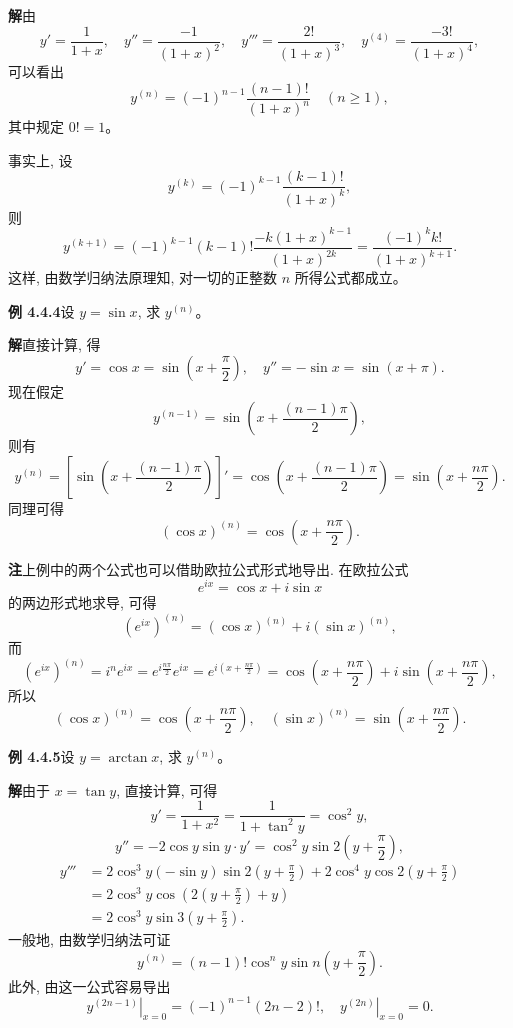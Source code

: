 \documentclass[UTF8, 12pt, fontset=fandol, oneside]{ctexart}
\begin{document}
\noindent\textbf{解}\quad 由
\[
  y'=\frac{1}{1+x},\quad
  y''=\frac{-1}{(1+x)^2},\quad
  y'''=\frac{2!}{(1+x)^3},\quad
  y^{(4)}=\frac{-3!}{(1+x)^4},
\]
可以看出
\[
  y^{(n)}
  =
  (-1)^{n-1}\frac{(n-1)!}{(1+x)^n}
  \quad(n\geqslant1),
\]
其中规定 $0!=1$。

事实上, 设
\[
  y^{(k)}
  =
  (-1)^{k-1}\frac{(k-1)!}{(1+x)^k},
\]
则
\[
  y^{(k+1)}
  =
  (-1)^{k-1}(k-1)!\frac{-k(1+x)^{k-1}}{(1+x)^{2k}}
  =
  \frac{(-1)^kk!}{(1+x)^{k+1}}.
\]
这样, 由数学归纳法原理知, 对一切的正整数 $n$ 所得公式都成立。

\noindent\textbf{例 4.4.4}\quad 设 $y=\sin x$, 求 $y^{(n)}$。

\noindent\textbf{解}\quad 直接计算, 得
\[
  y'=\cos x=\sin\left(x+\frac{\pi}{2}\right),
  \quad
  y''=-\sin x=\sin(x+\pi).
\]
现在假定
\[
  y^{(n-1)}
  =
  \sin\left(x+\frac{(n-1)\pi}{2}\right),
\]
则有
\[
  y^{(n)}
  =
  \left[\sin\left(x+\frac{(n-1)\pi}{2}\right)\right]'
  =
  \cos\left(x+\frac{(n-1)\pi}{2}\right)
  =
  \sin\left(x+\frac{n\pi}{2}\right).
\]
同理可得
\[
  (\cos x)^{(n)}
  =
  \cos\left(x+\frac{n\pi}{2}\right).
\]

\noindent\textbf{注}\quad 上例中的两个公式也可以借助欧拉公式形式地导出. 在欧拉公式
\[
  e^{ix}=\cos x+i\sin x
\]
的两边形式地求导, 可得
\[
  (e^{ix})^{(n)}
  =
  (\cos x)^{(n)}+i(\sin x)^{(n)},
\]
而
\[
  (e^{ix})^{(n)}
  =
  i^ne^{ix}
  =
  e^{i\frac{n\pi}{2}}e^{ix}
  =
  e^{i\left(x+\frac{n\pi}{2}\right)}
  =
  \cos\left(x+\frac{n\pi}{2}\right)
  +
  i\sin\left(x+\frac{n\pi}{2}\right),
\]
所以
\[
  (\cos x)^{(n)}
  =
  \cos\left(x+\frac{n\pi}{2}\right),\quad
  (\sin x)^{(n)}
  =
  \sin\left(x+\frac{n\pi}{2}\right).
\]

\noindent\textbf{例 4.4.5}\quad 设 $y=\arctan x$, 求 $y^{(n)}$。

\noindent\textbf{解}\quad 由于 $x=\tan y$, 直接计算, 可得
\[
  y'=\frac{1}{1+x^2}
  =
  \frac{1}{1+\tan^2y}
  =
  \cos^2y,
\]
\[
  y''
  =
  -2\cos y\sin y\cdot y'
  =
  \cos^2y\sin2\left(y+\frac{\pi}{2}\right),
\]
\[
\begin{aligned}
  y'''
  &=
  2\cos^3y(-\sin y)\sin2\left(y+\frac{\pi}{2}\right)
  +
  2\cos^4y\cos2\left(y+\frac{\pi}{2}\right)  \\
  &=
  2\cos^3y\cos\left(2\left(y+\frac{\pi}{2}\right)+y\right)  \\
  &=
  2\cos^3y\sin3\left(y+\frac{\pi}{2}\right).
\end{aligned}
\]
一般地, 由数学归纳法可证
\[
  y^{(n)}
  =
  (n-1)!\cos^ny\sin n\left(y+\frac{\pi}{2}\right).
\]
此外, 由这一公式容易导出
\[
  \left.y^{(2n-1)}\right|_{x=0}
  =
  (-1)^{n-1}(2n-2)!,
  \quad
  \left.y^{(2n)}\right|_{x=0}=0.
\]
\end{document}
